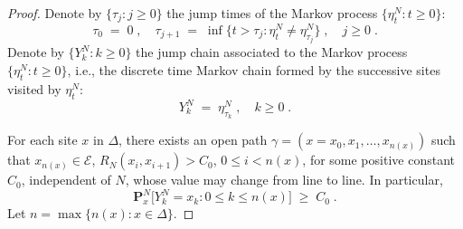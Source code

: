\documentclass[reqno]{amsart}
\begin{document}
\begin{proof}
Denote by $\{\tau_j : j\ge 0\}$ the jump times of the Markov process
$\{\eta^N_t : t\ge 0\}$:
\begin{equation*}
\tau_0 \;=\; 0\;, \quad \tau_{j+1} \;=\; 
\inf\{t>\tau_j : \eta^N_t \not = \eta^N_{\tau_j}\}\;, \quad j\ge 0\;.
\end{equation*}
Denote by $\{Y^N_k : k\ge 0\}$ the jump chain associated to the Markov
process $\{\eta^N_t : t\ge 0\}$, i.e., the discrete time Markov chain
formed by the successive sites visited by $\eta^N_t$:
\begin{equation*}
Y^N_k \;=\; \eta^N_{\tau_k}\;, \quad k\ge 0\;.
\end{equation*}

For each site $x$ in $\Delta$, there exists an open path $\gamma
=(x=x_0, x_1, \dots, x_{n(x)})$ such that $x_{n(x)}\in{{\mathcal E}}$,
$R_N(x_i, x_{i+1}) > C_0$, $0\le i < n(x)$, for some positive constant
$C_0$, independent of $N$, whose value may change from line to
line. In particular,
\begin{equation}
\label{14}
{{\mathbf P}}^N_x \big[ Y^N_k = x_k : 0\le k\le n(x) \big] \;\ge\; C_0\;.
\end{equation}
Let $n=\max \{ n(x) : x\in\Delta\}$.


\end{proof}
\end{document}
